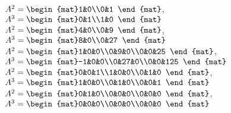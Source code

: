 \begin{Answer}
\Question $A^2=\begin{mat}1&0\\0&1 \end{mat}$, $A^3=\begin{mat}0&1\\1&0 \end{mat}$
\Question $A^2=\begin{mat}4&0\\0&9 \end{mat}$, $A^3=\begin{mat}8&0\\0&27 \end{mat}$
\Question $A^2=\begin{mat}1&0&0\\0&9&0\\0&0&25 \end{mat}$, $A^3=\begin{mat}-1&0&0\\0&27&0\\0&0&125 \end{mat}$
\Question $A^2=\begin{mat}0&0&1\\1&0&0\\0&1&0 \end{mat}$, $A^3=\begin{mat}1&0&0\\0&1&0\\0&0&1 \end{mat}$
\Question $A^2=\begin{mat}0&1&0\\0&0&0\\0&0&0 \end{mat}$, $A^3=\begin{mat}0&0&0\\0&0&0\\0&0&0 \end{mat}$
\end{Answer}
